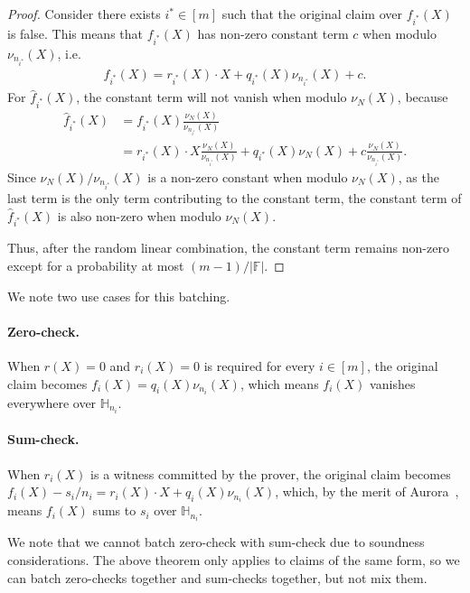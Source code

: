 \begin{proof}
Consider there exists $i^*\in [m]$ such that the original
  claim over $f_{i^*}(X)$ is false.
  This means that $f_{i^*}(X)$ has non-zero
  constant term $c$ when modulo $\nu_{n_{i^*}}(X)$, i.e.
  \begin{align}
    f_{i^*}(X) = r_{i^*}(X)\cdot X + q_{i^*}(X)\nu_{n_{i^*}}(X) + c.
  \end{align}
  For $\widehat{f}_{i^*}(X)$, the constant term will not vanish
  when modulo $\nu_N(X)$, because
  \begin{align}
    \widehat{f}_{i^*}(X) &= f_{i^*}(X)\frac{\nu_N(X)}{\nu_{n_{i^*}}(X)}\\
    &= r_{i^*}(X)\cdot X\frac{\nu_N(X)}{\nu_{n_{i^*}}(X)} + q_{i^*}(X)\nu_N(X) + c\frac{\nu_N(X)}{\nu_{n_{i^*}}(X)}.
  \end{align}
  Since $\nu_N(X)/\nu_{n_{i^*}}(X)$ is a non-zero constant when modulo $\nu_N(X)$, as the last term is the only term contributing to the constant term,
  the constant term of $\widehat{f}_{i^*}(X)$ is also non-zero when modulo $\nu_N(X)$.

Thus, after the random linear combination,
  the constant term remains non-zero except for a probability at most $(m-1)/|\mathbb{F}|$.
\end{proof}

We note two use cases for this batching.

\paragraph{Zero-check.} When $r(X) = 0$ and $r_i(X) = 0$ is required for every $i\in [m]$, the original
claim becomes $f_i(X) = q_i(X)\nu_{n_i}(X)$, which means
$f_i(X)$ vanishes everywhere over $\mathbb{H}_{n_i}$.

\paragraph{Sum-check.} When $r_i(X)$ is a witness committed by the prover,
the original claim becomes $f_i(X) - s_i/n_i = r_i(X)\cdot X + q_i(X)\nu_{n_i}(X)$, which, by the merit of Aurora~\cite{aurora19}, means $f_i(X)$ sums to $s_i$ over $\mathbb{H}_{n_i}$.

We note that we cannot batch zero-check with sum-check due to soundness
considerations. The above theorem only applies to claims of the same form, so we can batch zero-checks together and sum-checks together, but not mix them.


